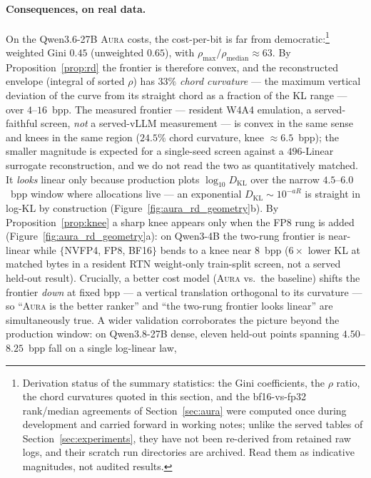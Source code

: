 \documentclass[11pt]{article}
\theoremstyle{plain}
\theoremstyle{definition}
\newcommand{\kl}{D_{\mathrm{KL}}}
\begin{document}
\paragraph{Consequences, on real data.} On the Qwen3.6-27B
\textsc{Aura} costs, the cost-per-bit is far from democratic:\footnote{Derivation
status of the summary statistics: the Gini coefficients, the $\rho$ ratio, the
chord curvatures quoted in this section, and the bf16-vs-fp32 rank/median
agreements of Section~\ref{sec:aura} were computed once during development and
carried forward in working notes; unlike the served tables of
Section~\ref{sec:experiments}, they have not been re-derived from retained raw
logs, and their scratch run directories are archived. Read them as indicative
magnitudes, not audited results.} weighted Gini
$0.45$ (unweighted $0.65$), with $\rho_{\max}/\rho_{\mathrm{median}}\approx 63$.
By Proposition~\ref{prop:rd} the frontier is therefore convex, and the
reconstructed envelope (integral of sorted $\rho$) has $33\%$ \emph{chord
curvature} --- the maximum vertical deviation of the curve from its straight chord
as a fraction of the KL range --- over $4$--$16$~bpp. The measured frontier --- resident W4A4 emulation, a served-faithful
screen, \emph{not} a served-vLLM measurement --- is convex in the same sense
and knees in the same region ($24.5\%$ chord curvature, knee
$\approx6.5$~bpp); the smaller magnitude is expected for a single-seed
screen against a $496$-Linear surrogate reconstruction, and we do not read
the two as quantitatively matched. It \emph{looks} linear only because production plots
$\log_{10}\kl$ over the narrow $4.5$--$6.0$~bpp window where allocations live ---
an exponential $\kl\!\sim\!10^{-aR}$ is straight in log-KL by construction
(Figure~\ref{fig:aura_rd_geometry}b). By Proposition~\ref{prop:knee} a sharp
knee appears only when the FP8 rung is added (Figure~\ref{fig:aura_rd_geometry}a):
on Qwen3-4B the two-rung frontier is near-linear while
$\{$NVFP4, FP8, BF16$\}$ bends to a knee near $8$~bpp ($6\times$ lower KL at
matched bytes in a resident RTN weight-only train-split screen, not a served
held-out result). Crucially, a better cost model (\textsc{Aura} vs.\ the baseline)
shifts the frontier \emph{down} at fixed bpp --- a vertical translation
orthogonal to its curvature --- so ``\textsc{Aura} is the better ranker'' and
``the two-rung frontier looks linear'' are simultaneously true. A wider validation
corroborates the picture beyond the production window: on Qwen3.8-27B dense,
eleven held-out points spanning $4.50$--$8.25$~bpp fall on a single log-linear law,
\end{document}
